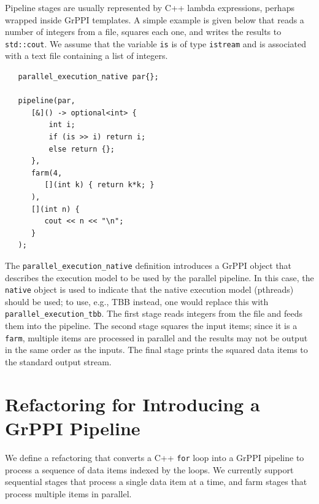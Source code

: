 \noindent
Pipeline stages are usually represented by C++ lambda expressions,
perhaps wrapped inside GrPPI templates.  A simple example is given
below that reads a number of integers from a file, squares each one,
and writes the results to \verb|std::cout|. We assume that the
variable \verb|is| is of type \verb|istream| and is associated
with a text file containing a list of integers.

{\scriptsize
\begin{lstlisting}
   parallel_execution_native par{};

   pipeline(par,
      [&]() -> optional<int> {
          int i;
          if (is >> i) return i;
          else return {};
      },
      farm(4,
         [](int k) { return k*k; }
      ),
      [](int n) {
         cout << n << "\n";
      }
   );
\end{lstlisting}
}

\noindent
The \verb|parallel_execution_native| definition introduces a GrPPI
object that describes the execution model to be used by 
the parallel pipeline. In this case, the \verb|native| object is
used to indicate that the native execution model (pthreads) should be used; 
to use, e.g., TBB instead, one would replace this with \verb|parallel_execution_tbb|.
The first stage reads integers from the file and feeds them into the pipeline. The second stage squares the input items; since it is a \verb|farm|,
multiple items are processed in parallel and the results may not be output
in the same order as the inputs.
The final stage prints the squared data items to the standard output stream.


\section{Refactoring for Introducing a GrPPI Pipeline}
\label{refactoring_grppi}



We define a refactoring that converts a C++
\texttt{for} loop into a GrPPI pipeline
to process a sequence of data items
indexed by the loops. We currently support sequential stages that
process a single data item at a time, and farm stages that process
multiple items in parallel. 

